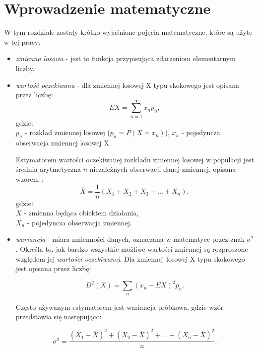\documentclass[magister]{dyplom}
\begin{document}
\chapter{Wprowadzenie matematyczne}
W tym rozdziale zostały krótko wyjaśnione pojęcia matematyczne, które są użyte w tej pracy:\\
\begin{itemize}
\item \textit{zmienna losowa} - jest to funkcja przypisująca zdarzeniom elementarnym liczby\cite{random_variable}.
\newline

\item \textit{wartość oczekiwana} - dla zmiennej losowej X typu skokowego jest opisana przez liczbę:
\begin{equation}
	EX = \sum_{n=1}^{\infty}x_np_n,
\end{equation}
gdzie:\\
$p_n$ - rozkład zmiennej losowej ($p_n = P(X = x_n)$),\newline
$x_n$ - pojedyncza obserwacja zmiennej losowej X.

Estymatorem wartości oczekiwanej rozkładu zmiennej losowej w populacji jest średnia arytmetyczna $n$ niezależnych obserwacji danej zmiennej, opisana wzorem \cite{expected_value}:
\begin{equation}
	\overline{X} = \frac{1}{n}(X_1 + X_2 + X_3 + \dots + X_n),
\end{equation}
gdzie:\\
$X$ - zmienna będąca obiektem działania,\\
$X_n$ - pojedyncza obserwacja zmiennej.
\newline

\item \textit{wariancja} - miara zmienności danych, oznaczana w matematyce przez znak $\sigma^2$. Określa to, jak bardzo wszystkie możliwe wartości zmiennej są rozproszone względem jej \textit{wartości oczekiwanej}. Dla zmiennej losowej X typu skokowego jest opisana przez liczbę:

\begin{equation}
	D^2(X) = \sum_n(x_n - EX)^2p_n.
\end{equation}

Często używanym estymatorem jest wariancja próbkowa, gdzie wzór przedstawia się następująco:

\begin{equation}
	\sigma^2 = \frac{(X_1 - \overline{X})^2 + (X_2 - \overline{X})^2 + \dots + (X_n - \overline{X})^2}{n}.
\end{equation}


\end{itemize}
\end{document}

